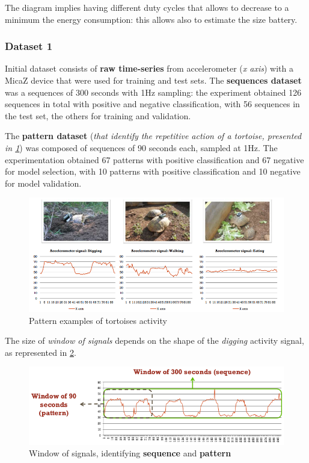 \documentclass[10pt,a4paper]{report}
\theoremstyle{definition}
\begin{document}
The diagram implies having different duty cycles that allows to decrease to a minimum the energy consumption: this allows also to estimate the size battery.
\subsubsection{Dataset 1}\label{sec:dataset-1}
Initial dataset consists of \textbf{raw time-series} from accelerometer (\textit{x axis}) with a MicaZ device that were used for training and test sets.
The \textbf{sequences dataset} was a sequences of 300 seconds with 1Hz sampling: the experiment obtained 126 sequences in total with positive and negative classification, with 56 sequences in the test set, the others for training and validation.

The \textbf{pattern dataset} (\textit{that identify the repetitive action of a tortoise, presented in \ref{pattern-dataset}}) was composed of sequences of 90 seconds each, sampled at 1Hz. The experimentation obtained 67 patterns with positive classification and 67 negative for model selection, with 10 patterns with positive classification and 10 negative for model validation.

\begin{figure}[b]
	\centering\includegraphics[scale=0.50]{images/Pasted image 20230331164955.png}
	\caption{Pattern examples of tortoises activity}
	\label{pattern-dataset}
\end{figure}


The size of \textit{window of signals} depends on the shape of the \textit{digging} activity signal, as represented in \ref{signal-window}.
\begin{figure}
	\centering\includegraphics[scale=0.50]{images/Pasted image 20230401153511.png}
	\caption{Window of signals, identifying \textbf{sequence} and \textbf{pattern}}
	\label{signal-window}
\end{figure}
\end{document}
